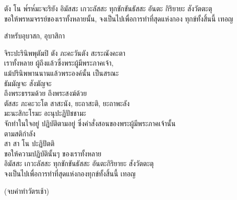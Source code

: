 \documentclass{article}
\begin{document}
ตัง โน พ๎รห๎มะจะริยัง อิมัสสะ เกวะลัสสะ ทุกขักขันธัสสะ อันตะ กิริยายะ สังวัตตะตุ\\
\indent ขอให้พรหมจรรย์ของเราทั้งหลายนั้น, จงเป็นไปเพื่อการทำที่สุดแห่งกอง ทุกข์ทั้งสิ้นนี้ เทอญ\\
\begin{center}สำหรับอุบาสก, อุบาสิกา\end{center}
จิระปะรินิพพุตัมปิ ตัง ภะคะวันตัง สะระณังคะตา\\
\indent เราทั้งหลาย ผู้ถึงแล้วซึ่งพระผู้มีพระภาคเจ้า,\\
แม้ปรินิพพานนานแล้วพระองค์นั้น เป็นสรณะ\\
ธัมมัญจะ สังฆัญจะ\\
\indent ถึงพระธรรมด้วย ถึงพระสงฆ์ด้วย\\
ตัสสะ ภะคะวะโต สาสะนัง, ยะถาสะติ, ยะถาพะลัง\\
มะนะสิกะโรมะ อะนุปะฏิปัชชามะ\\
\indent จักทำในใจอยู่ ปฏิบัติตามอยู่ ซึ่งคำสั่งสอนของพระผู้มีพระภาคเจ้านั้น\\
ตามสติกำลัง\\
สา สา โน ปะฏิปัตติ\\
\indent ขอให้ความปฏิบัตินั้นๆ ของเราทั้งหลาย\\
อิมัสสะ เกวะลัสสะ ทุกขักขันธัสสะ อันตะกิริยายะ สังวัตตะตุ\\
\indent จงเป็นไปเพื่อการทำที่สุดแห่งกองทุกข์ทั้งสิ้นนี้ เทอญ\\
\begin{center}
(จบคำทำวัตรเช้า)
\end{center}
\pagebreak
\end{document}
